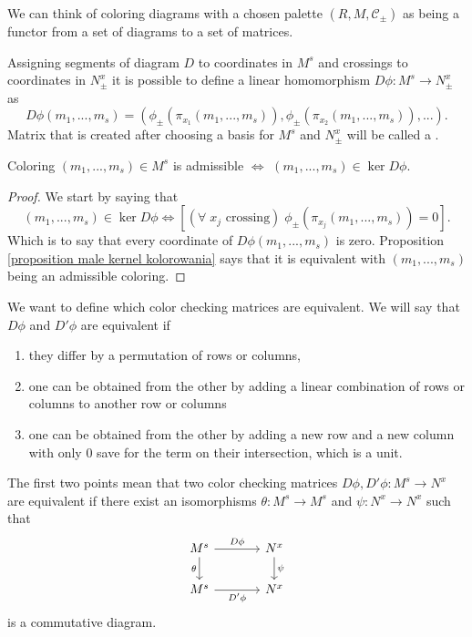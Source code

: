We can think of coloring diagrams with a chosen palette $(R, M, \mathcal{C}_\pm)$ as being a {\color{red}functor from a set of diagrams to a set of matrices}.

\begin{definition}\label{def:color checking matrix}
  Assigning segments of diagram $D$ to coordinates in $M^s$ and crossings to coordinates in $N_\pm^x$ it is possible to define a linear homomorphism $D\phi:M^s\to N_\pm^x$  as
  $$D\phi(m_1,...,m_s)=(\phi_\pm(\pi_{x_1}(m_1,...,m_s)), \phi_\pm(\pi_{x_2}(m_1,...,m_s)),...).$$
  Matrix that is created after choosing a basis for $M^s$ and $N_\pm^x$ will be called a .
\end{definition}

\begin{proposition}
  Coloring $(m_1,...,m_s)\in M^s$ is admissible $\iff$ $(m_1,...,m_s)\in\ker D\phi$.
\end{proposition}

\begin{proof}
  We start by saying that 
  $$(m_1,..., m_s)\in\ker D\phi\iff [(\forall\;x_j\text{ crossing})\;\phi_\pm(\pi_{x_j}(m_1,..., m_s))=0].$$
  Which is to say that every coordinate of $D\phi(m_1,..., m_s)$ is zero. Proposition \cref{proposition male kernel kolorowania} says that it is equivalent with $(m_1,..., m_s)$ being an admissible coloring.
\end{proof}

We want to define which color checking matrices are equivalent. We will say that $D\phi$ and $D'\phi$ are equivalent if 
\begin{enumerate}
  \item they differ by a permutation of rows or columns, 
  \item one can be obtained from the other by adding a linear combination of rows or columns to another row or columns 
  \item one can be obtained from the other by adding a new row and a new column with only $0$ save for the term on their intersection, which is a unit.
\end{enumerate}
The first two points mean that two color checking matrices $D\phi, D'\phi:M^s\to N^x$ are equivalent if there exist an isomorphisms $\theta:M^s\to M^s$ and $\psi:N^x\to N^x$ such that
$$
\begin{tikzcd}[column sep=large]
  M^s\arrow[r, "D\phi"]\arrow[d, "\theta" left] & N^x\arrow[d, "\psi" right]\\ 
  M^s\arrow[r, "D'\phi" below] & N^x
\end{tikzcd}
$$
is a commutative diagram. 

